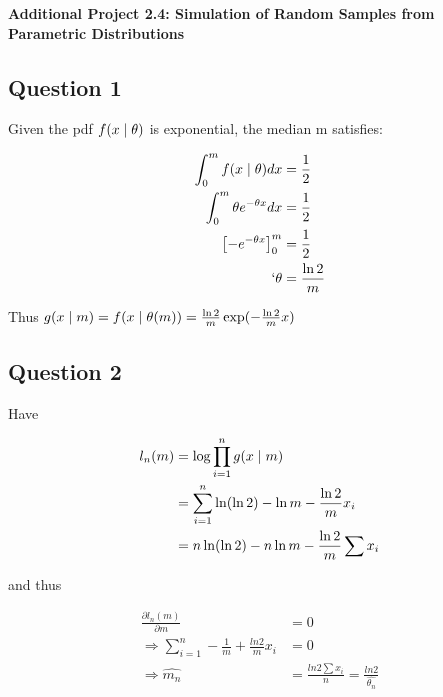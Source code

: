 \documentclass[10pt,a4paper]{report}
\begin{document}
\textbf{Additional Project 2.4: Simulation of Random Samples from Parametric Distributions}
\thispagestyle{empty}

\newpage

\subsection*{Question 1}

Given the pdf $f(x \hspace{1mm}| \hspace{1mm} \theta)$ is exponential, the median m satisfies:

\begin{align*}
\int_0^m f(x \hspace{1mm}| \hspace{1mm} \theta) dx &= \frac{1}{2}\\
\int_0^m \theta e^{-\theta x} dx &= \frac{1}{2}\\
\left[-e^{-\theta x}\right]_0^m &=\frac{1}{2}\\`
\theta &= \frac{\ln{2}}{m}
\end{align*}

Thus $g(x \hspace{1mm}| \hspace{1mm} m) = f(x \hspace{1mm}| \hspace{1mm} \theta(m)) = \frac{\ln2}{m}\exp(-\frac{\ln2}{m}x)$

\subsection*{Question 2}

Have 

\begin{align*}
l_n(m)&=\log\prod_{i=1}^ng(x \hspace{1mm}| \hspace{1mm} m)\\
&=\sum_{i=1}^n \ln(\ln2) - \ln m -\frac{\ln2}{m}x_i\\
&=n\ln(\ln 2)-n\ln m-\frac{\ln 2}{m}\sum x_i\\
\end{align*}

and thus 

\begin{align*}
\frac{\partial l_n(m)}{\partial m} &= 0\\
\Rightarrow \sum_{i=1}^n -\frac{1}{m} + \frac{ln2}{m}x_i &=0\\
\Rightarrow \hat{m_n} &= \frac{ln2\sum x_i}{n}=\frac{ln2}{\hat{\theta_n}}
\end{align*}
\end{document}

